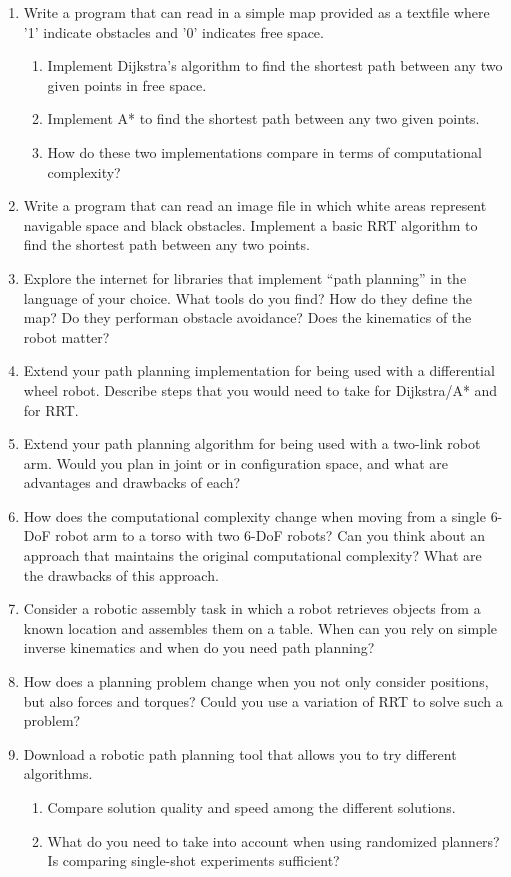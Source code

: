 \begin{enumerate}
\item Write a program that can read in a simple map provided as a textfile where '1' indicate obstacles and '0' indicates free space.
\begin{enumerate}
\item Implement Dijkstra's algorithm to find the shortest path between any two given points in free space.
\item Implement A* to find the shortest path between any two given points.
\item How do these two implementations compare in terms of computational complexity?
\end{enumerate}
\item Write a program that can read an image file in which white areas represent navigable space and black obstacles. Implement a basic RRT algorithm to find the shortest path between any two points.
\item Explore the internet for libraries that implement ``path planning'' in the language of your choice. What tools do you find? How do they define the map? Do they performan obstacle avoidance? Does the kinematics of the robot matter?
\item Extend your path planning implementation for being used with a differential wheel robot. Describe steps that you would need to take for Dijkstra/A* and for RRT.
\item Extend your path planning algorithm for being used with a two-link robot arm. Would you plan in joint or in configuration space, and what are advantages and drawbacks of each?
\item How does the computational complexity change when moving from a single 6-DoF robot arm to a torso with two 6-DoF robots? Can you think about an approach that maintains the original computational complexity? What are the drawbacks of this approach.
\item Consider a robotic assembly task in which a robot retrieves objects from a known location and assembles them on a table. When can you rely on simple inverse kinematics and when do you need path planning?
\item How does a planning problem change when you not only consider positions, but also forces and torques? Could you use  a variation of RRT to solve such a problem?
\item Download a robotic path planning tool that allows you to try different algorithms.
\begin{enumerate}
\item Compare solution quality and speed among the different solutions.
\item What do you need to take into account when using randomized planners? Is comparing single-shot experiments sufficient?
\end{enumerate}
\end{enumerate}

\normalsize

